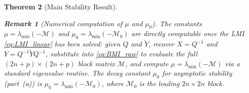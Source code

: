 \documentclass[10pt]{amsart}
\numberwithin{equation}{section}
\newtheorem{theorem}{Theorem}[section]
\newtheorem{remark}[theorem]{Remark}
\begin{document}
\begin{theorem}[Main Stability Result]
\begin{enumerate}
             \begin{remark}[Numerical computation of $\mu$ and $\mu_0$]
             \label{rem:mu_compute}
               The constants $\mu = \lambda_{\min}(-\mathcal{M})$ and
               $\mu_0 = \lambda_{\min}(-\mathcal{M}_0)$ are directly computable once
               the LMI \eqref{eq:LMI_linear} has been solved: given $Q$ and
               $\tilde{Y}$, recover $X = Q^{-1}$ and $Y = Q^{-1}\tilde{Y}Q^{-1}$,
               substitute into \eqref{eq:BMI_raw} to evaluate the full
               $(2n+p)\times(2n+p)$ block matrix $\mathcal{M}$, and compute
               $\mu = \lambda_{\min}(-\mathcal{M})$ via a standard eigenvalue routine.
               The decay constant $\mu_0$ for asymptotic stability (part~(a)) is
               $\mu_0 = \lambda_{\min}(-\mathcal{M}_0)$, where $\mathcal{M}_0$ is the
               leading $2n\times 2n$ block.
             \end{remark}
\end{enumerate}
\end{theorem}
\end{document}
